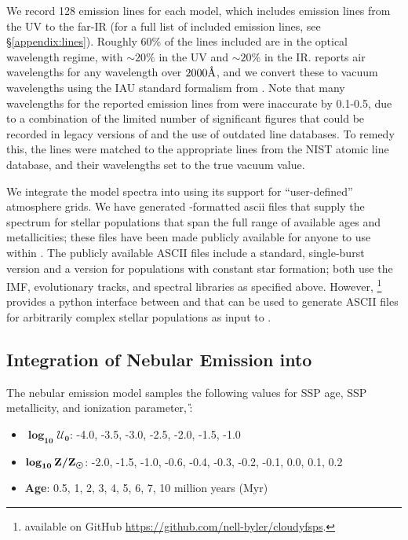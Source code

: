 We record 128 emission lines for each model, which includes emission lines from the UV to the far-IR (for a full list of included emission lines, see \S\ref{appendix:lines}). Roughly 60\% of the lines included are in the optical wavelength regime, with ${\sim20}\%$ in the UV and ${\sim}20\%$ in the IR. \Cloudy reports air wavelengths for any wavelength over $2000\mbox{\AA}$, and we convert these to vacuum wavelengths using the IAU standard formalism from \citet{Morton1991}. Note that many wavelengths for the reported emission lines from \Cloudy were inaccurate by 0.1-0.5\ang{}, due to a combination of the limited number of significant figures that could be recorded in legacy versions of \Cloudy and the use of outdated line databases. To remedy this, the lines were matched to the appropriate lines from the NIST atomic line database, and their wavelengths set to the true vacuum value.

We integrate the \FSPS model spectra into \Cloudy using its support for ``user-defined'' atmosphere grids. We have generated \Cloudy-formatted ascii files that supply the \FSPS spectrum for stellar populations that span the full range of available ages and metallicities; these files have been made publicly available for anyone to use within \Cloudy. The publicly available ASCII files include a standard, single-burst version and a version for populations with constant star formation; both use the IMF, evolutionary tracks, and spectral libraries as specified above. However, \CloudyFSPS\footnote{available on GitHub \url{https://github.com/nell-byler/cloudyfsps}.} provides a python interface between \FSPS and \Cloudy that can be used to generate ASCII files for arbitrarily complex stellar populations as input to \Cloudy.

\subsection{Integration of Nebular Emission into \FSPS}\label{sec:methods:fsps}

The nebular emission model samples the following values for SSP age, SSP metallicity, and ionization parameter, \U{}:
\begin{itemize}
\item[] $\boldsymbol{\log_{10} \mathcal{U}_0}$: -4.0, -3.5, -3.0, -2.5, -2.0, -1.5, -1.0
\item[] $\boldsymbol{\log_{10} {\rm Z}/{\rm Z}_{\odot}}$: -2.0, -1.5, -1.0, -0.6, -0.4, -0.3, -0.2, -0.1, 0.0, 0.1, 0.2
\item[] {\bf Age}: 0.5, 1, 2, 3, 4, 5, 6, 7, 10 million years (Myr)
\end{itemize}

